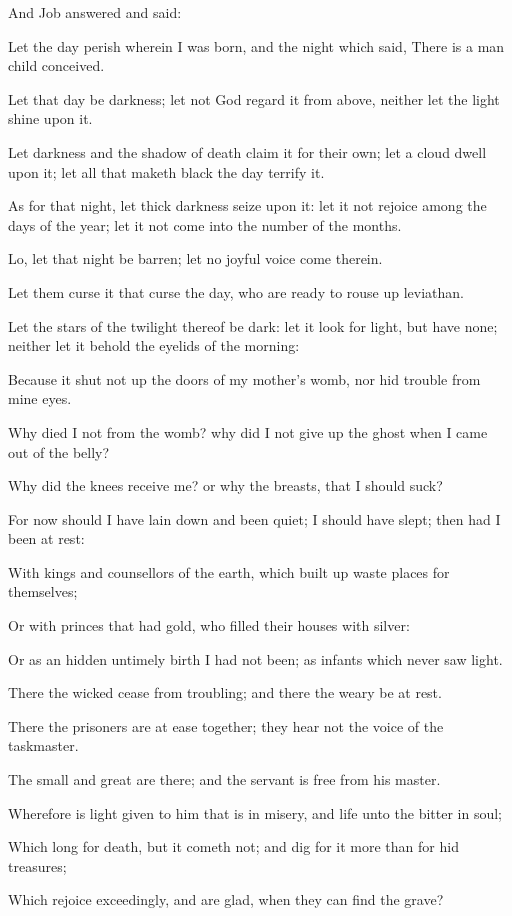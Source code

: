 \documentclass[12pt,oneside]{book}
\begin{document}
And Job answered and said:

Let the day perish wherein I was born, and the night which said, There is a man child conceived.

Let that day be darkness; let not God regard it from above, neither let the light shine upon it.

Let darkness and the shadow of death claim it for their own; let a cloud dwell upon it; let all that maketh black the day terrify it.

As for that night, let thick darkness seize upon it: let it not rejoice among the days of the year; let it not come into the number of the months.

Lo, let that night be barren; let no joyful voice come therein.

Let them curse it that curse the day, who are ready to rouse up leviathan.

Let the stars of the twilight thereof be dark: let it look for light, but have none; neither let it behold the eyelids of the morning:

Because it shut not up the doors of my mother's womb, nor hid trouble from mine eyes.

Why died I not from the womb? why did I not give up the ghost when I came out of the belly?

Why did the knees receive me? or why the breasts, that I should suck?

For now should I have lain down and been quiet; I should have slept; then had I been at rest:

With kings and counsellors of the earth, which built up waste places for themselves;

Or with princes that had gold, who filled their houses with silver:

Or as an hidden untimely birth I had not been; as infants which never saw light.

There the wicked cease from troubling; and there the weary be at rest.

There the prisoners are at ease together; they hear not the voice of the taskmaster.

The small and great are there; and the servant is free from his master.

Wherefore is light given to him that is in misery, and life unto the bitter in soul;

Which long for death, but it cometh not; and dig for it more than for hid treasures;

Which rejoice exceedingly, and are glad, when they can find the grave?
\end{document}
